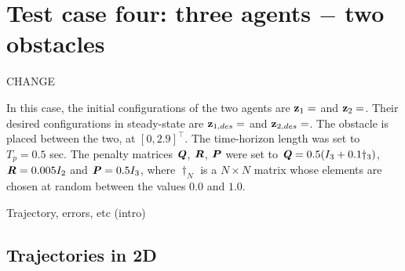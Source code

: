 \section{Test case four: three agents $-$ two obstacles}

CHANGE

In this case, the initial configurations of the two agents are
$\bm{\mathbf{z}}_1 = $ and
$\bm{\mathbf{z}}_2 = $.
Their desired configurations in steady-state are
$\bm{\mathbf{z}}_{1,des} = $ and
$\bm{\mathbf{z}}_{2,des} = $.
The obstacle is placed between the two, at $[0, 2.9]^{\top}$. The time-horizon
length was set to $T_p = 0.5$ sec. The penalty matrices $\bm{\mathit{Q}}$, $\bm{\mathit{R}}$,
$\bm{\mathit{P}}$ were set to $\bm{\mathit{Q}} = 0.5 (I_3 + 0.1 \dagger_3)$,
$\bm{\mathit{R}} = 0.005 I_2$ and $\bm{\mathit{P}} = 0.5 I_3$, where $\dagger_N$ is a
$N \times N$ matrix whose elements are chosen at random between the values $0.0$
and $1.0$.

Trajectory, errors, etc (intro)


\subsection{Trajectories in 2D}

\noindent{}

\noindent{}

